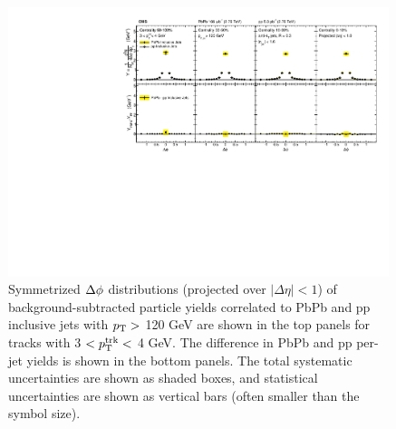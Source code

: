 \begin{figure}[hbt] 
\begin{center} 
\includegraphics[width=0.99\textwidth]{figures/Results/PAS_Figure_4_TrkPt3_TrkPt4.pdf}
\caption[Inclusive jet $\Delta\phi$ correlations for tracks with $3 < p_{\rm T}^{\rm trk} < 4$ GeV at 2.76 TeV]{Symmetrized $\protect\Delta\phi$ distributions  (projected over $|\Delta\eta| < 1$) of background-subtracted particle yields correlated to PbPb and pp inclusive jets with $p_{\rm T} >$ 120 GeV are shown in the top panels for tracks with 3 $ < p_{\rm T}^{\rm trk} < $ 4 GeV.  The difference in PbPb and pp per-jet yields is shown in the bottom panels. The total systematic uncertainties are shown as shaded boxes, and statistical uncertainties are shown as vertical bars (often smaller than the symbol size).}
\label{fig:Inclusive_dPhi3} 
\end{center} 
\end{figure} 



